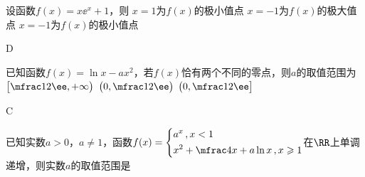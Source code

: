 %
%
\vspace{-2em}
\begin{exercise}
  \item %
    设函数$f(x)=x\ee^x+1$，则\xz
     {$x=1$为$f(x)$的极小值点}
     {$x=-1$为$f(x)$的极大值点}
     {$x=-1$为$f(x)$的极小值点}
    \begin{answer}
      D
    \end{answer}
  \item %
    已知函数$f(x)=\ln x-ax^2$，若$f(x)$恰有两个不同的零点，则$a$的取值范围为\xz
     {$\bigl[\mfrac1{2\ee},+\infty\bigr)$}
     {$\bigl(0,\mfrac1{2\ee}\bigr)$}
     {$\bigl(0,\mfrac1{2\ee}\bigr]$}
    \begin{answer}
      C
    \end{answer}
  \item %
    已知实数$a>0$，$a\neq1$，函数$f(x)=\Bigg\{\begin{aligned}
      &a^x\,,x<1\\
      &x^2+\mfrac4{x}+a\ln x\,,x\geqslant1
    \end{aligned}$在$\RR$上单调递增，则实数$a$的取值范围是\xz
    \xx{$(1,5]$}{$[2,5]$}{$[2,+\infty)$}{$(2,5]$}
    \begin{answer}

\end{answer}
\end{exercise}
